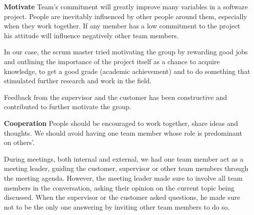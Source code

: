 \textbf{Motivate}\newline
Team's commitment will greatly improve many variables in a software project.
People are inevitably influenced by other people around them, especially when they work together.
If any member has a low commitment to the project his attitude will influence negatively other team members.




In our case, the scrum master tried motivating the group by rewarding good jobs
and outlining the importance of the project itself as a chance to acquire knowledge,
to get a good grade (academic achievement) and to do something that stimulated further
research and work in the field.

Feedback from the supervisor and the customer has been constructive and
contributed to further motivate the group.

\textbf{Cooperation}\newline
People should be encouraged to work together, share ideas and thoughts.
We should avoid having one team member whose role is predominant on others'.

During meetings, both internal and external, we had one team member
act as a meeting leader, guiding the customer, supervisor or other team members through
the meeting agenda. However, the meeting leader made sure to involve all team members
in the conversation, asking their opinion on the current topic being discussed.
When the supervisor or the customer asked questions, he made sure not to be the only one
answering by inviting other team members to do so.

